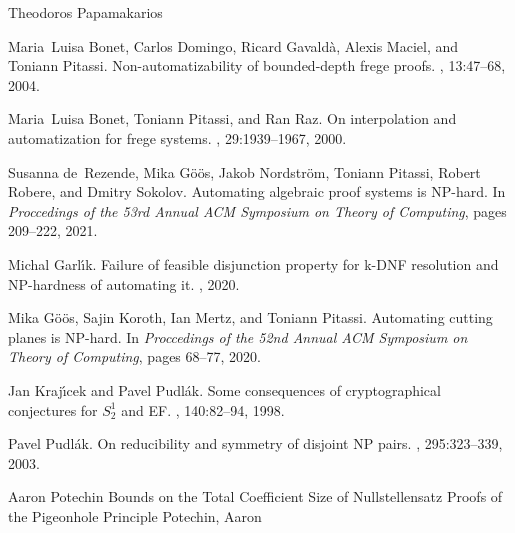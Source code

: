 \documentclass[report]{owrart}
\begin{document}
\begin{report}
\begin{talk}{Theodoros Papamakarios}
\begin{thebibliography}{99}
    Maria~Luisa Bonet, Carlos Domingo, Ricard Gavald{\`{a}}, Alexis Maciel, and
      Toniann Pitassi.
    \newblock Non-automatizability of bounded-depth frege proofs.
    , 13:47--68, 2004.
    
    Maria~Luisa Bonet, Toniann Pitassi, and Ran Raz.
    \newblock On interpolation and automatization for frege systems.
    , 29:1939--1967, 2000.
    
    Susanna de~Rezende, Mika G{\"{o}}{\"{o}}s, Jakob Nordstr{\"{o}}m, Toniann
      Pitassi, Robert Robere, and Dmitry Sokolov.
    \newblock Automating algebraic proof systems is {NP}-hard.
    \newblock In {\em Proccedings of the 53rd Annual {ACM} Symposium on Theory of
      Computing}, pages 209--222, 2021.
    
    Michal Garl{\'{\i}}k.
    \newblock Failure of feasible disjunction property for k-{DNF} resolution and
      {NP}-hardness of automating it.
    , 2020.
    
    Mika G{\"{o}}{\"{o}}s, Sajin Koroth, Ian Mertz, and Toniann Pitassi.
    \newblock Automating cutting planes is {NP}-hard.
    \newblock In {\em Proccedings of the 52nd Annual {ACM} Symposium on Theory of
      Computing}, pages 68--77, 2020.
    
    Jan Kraj{\'{\i}}cek and Pavel Pudl{\'{a}}k.
    \newblock Some consequences of cryptographical conjectures for {$S^1_2$} and
      {EF}.
    , 140:82--94, 1998.
    
    Pavel Pudl{\'{a}}k.
    \newblock On reducibility and symmetry of disjoint {NP} pairs.
    , 295:323--339, 2003.
  
  
  \end{thebibliography}
  
  \end{talk}
  
  \begin{talk}{Aaron Potechin}
    {Bounds on the Total Coefficient Size of Nullstellensatz Proofs of the Pigeonhole Principle}
    {Potechin, Aaron}


\end{talk}
\end{report}
\end{document}
